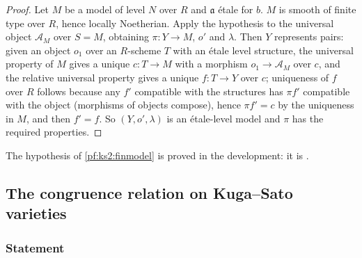 \begin{proof}
Let $M$ be a model of level $N$ over $R$ and $\mathfrak a$ \'etale for $b$. $M$ is smooth of finite
type over $R$, hence locally Noetherian. Apply the hypothesis to the universal object
$\mathcal A_M$ over $S=M$, obtaining $\pi\colon Y\to M$, $o'$ and $\lambda$. Then $Y$ represents
pairs: given an object $o_1$ over an
$R$-scheme $T$ with an \'etale level structure, the universal property of $M$ gives a unique
$c\colon T\to M$ with a morphism $o_1\to\mathcal A_M$ over $c$, and the relative universal property
gives a unique $f\colon T\to Y$ over $c$; uniqueness of $f$ over $R$ follows because any $f'$
compatible with the structures has $\pi f'$ compatible with the object (morphisms of objects
compose), hence $\pi f'=c$ by the uniqueness in $M$, and then $f'=f$. So $(Y,o',\lambda)$ is an
\'etale-level model and $\pi$ has the required properties.
\end{proof}

The hypothesis of \cref{pf:ks2:finmodel} is proved in the development: it is
.

\subsection{The congruence relation on Kuga--Sato varieties}\label{pf:ks2:sec:cong}

\subsubsection{Statement}


